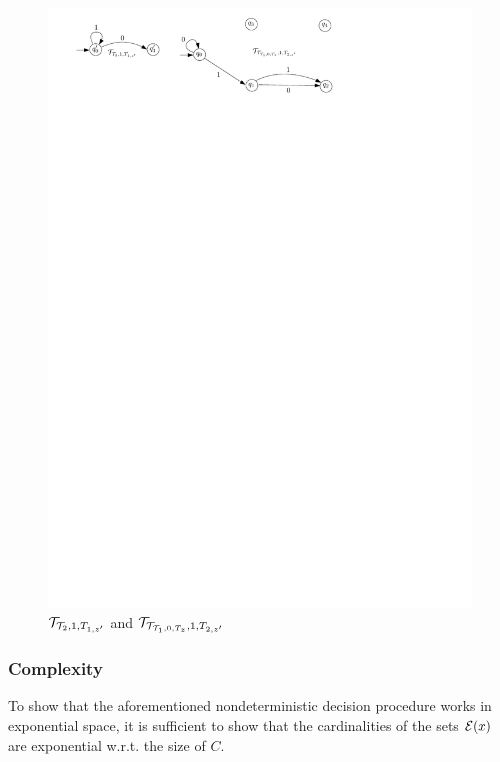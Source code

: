 \begin{example}
\begin{figure}[htbp]
\begin{center}
\includegraphics[scale=0.8]{single-letter-example-nested-2.pdf}
\end{center}
\caption{$\mathcal{T}_{\mathcal{T}_2, 1, T_{1,z'}}$ and $\mathcal{T}_{\mathcal{T}_{\mathcal{T}_1, 0, T_z}, 1, T_{2,z'}}$}\label{fig-sl-exmp-nested-2}
\end{figure}
\end{example}




\subsubsection{Complexity}

To show that the aforementioned nondeterministic decision procedure works in exponential space, it is sufficient to show that the cardinalities of the sets $\mathcal{E}(x)$ are exponential w.r.t. the size of $C$.

